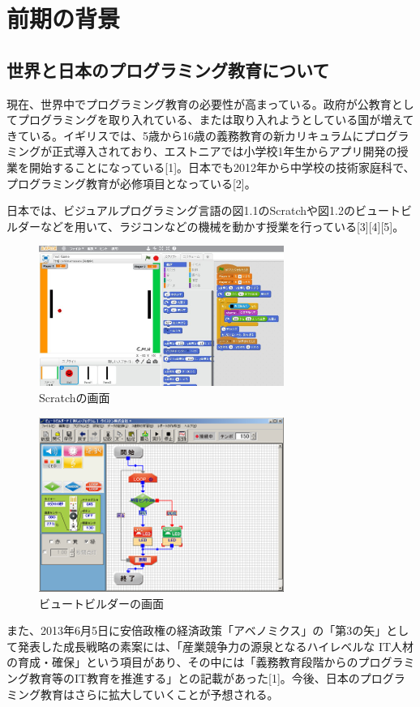 \documentclass[openany,11pt,papersize]{jsbook}
\begin{document}

\chapter{前期の背景}
\section{世界と日本のプログラミング教育について}
現在、世界中でプログラミング教育の必要性が高まっている。政府が公教育としてプログラミングを取り入れている、または取り入れようとしている国が増えてきている。イギリスでは、5歳から16歳の義務教育の新カリキュラムにプログラミングが正式導入されており、エストニアでは小学校1年生からアプリ開発の授業を開始することになっている[1]。日本でも2012年から中学校の技術家庭科で、プログラミング教育が必修項目となっている[2]。

日本では、ビジュアルプログラミング言語の図1.1のScratchや図1.2のビュートビルダーなどを用いて、ラジコンなどの機械を動かす授業を行っている[3][4][5]。
\begin{figure}[H]
\begin{center}
\includegraphics[width=8cm, bb=0 0 1306 780]{img/Scratch.jpg}
\end{center}
\caption{Scratchの画面}
\end{figure}



\begin{figure}[H]
\begin{center}
\includegraphics[width=8cm, bb=0 0 1006 770]{img/BeautoBuilderP_SSs.png}
\end{center}
\caption{ビュートビルダーの画面}
\end{figure}
また、2013年6月5日に安倍政権の経済政策「アベノミクス」の「第3の矢」として発表した成長戦略の素案には、「産業競争力の源泉となるハイレベルな IT人材の育成・確保」という項目があり、その中には「義務教育段階からのプログラミング教育等のIT教育を推進する」との記載があった[1]。今後、日本のプログラミング教育はさらに拡大していくことが予想される。
\end{document}
